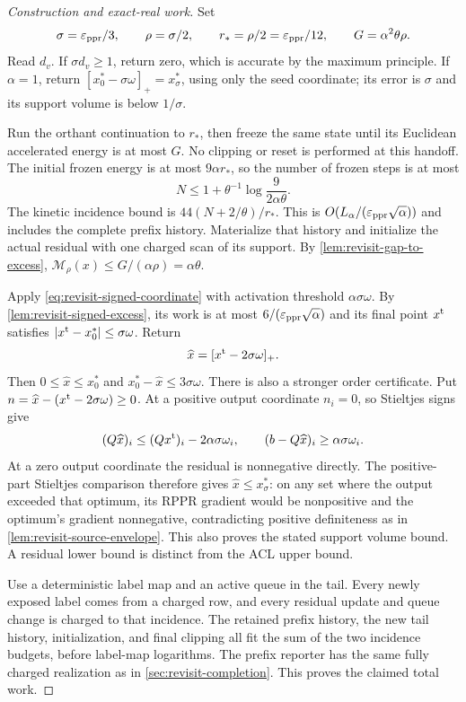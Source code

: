 \begin{proof}[Construction and exact-real work]
Set
\[
 \sigma=\varepsilon_{\mathrm{ppr}}/3,\qquad \rho=\sigma/2,\qquad
 r_*=\rho/2=\varepsilon_{\mathrm{ppr}}/12,\qquad G=\alpha^2\theta\rho.
\]
Read $d_v$. If $\sigma d_v\geq1$, return zero, which is accurate by
the maximum principle. If $\alpha=1$, return
$[x_0^*-\sigma\omega]_+=x_\sigma^*$, using only the seed coordinate;
its error is $\sigma$ and its support volume is below $1/\sigma$.

Run the orthant continuation to $r_*$, then freeze the same state until
its Euclidean accelerated energy is at most $G$. No clipping or reset is
performed at this handoff. The initial frozen energy is at most
$9\alpha r_*$, so the number of frozen steps is at most
\[
 N\leq1+\theta^{-1}\log\frac9{2\alpha\theta}.
\]
The kinetic incidence bound is
$44(N+2/\theta)/r_*$. This is
$O(L_\alpha/(\varepsilon_{\mathrm{ppr}}\sqrt\alpha))$ and includes the complete prefix
history. Materialize that history and initialize the actual residual with
one charged scan of its support. By \cref{lem:revisit-gap-to-excess},
$\mathcal M_\rho(x)\leq G/(\alpha\rho)=\alpha\theta$.

Apply \cref{eq:revisit-signed-coordinate} with activation threshold
$\alpha\sigma\omega$. By \cref{lem:revisit-signed-excess}, its work is
at most $6/(\varepsilon_{\mathrm{ppr}}\sqrt\alpha)$ and its final point $x^{\rm t}$
satisfies $|x^{\rm t}-x_0^*|\leq\sigma\omega$.
Return
\[
 \widehat x=[x^{\rm t}-2\sigma\omega]_+.
\]
Then $0\leq\widehat x\leq x_0^*$ and
$x_0^*-\widehat x\leq3\sigma\omega$.
There is also a stronger order certificate. Put
$n=\widehat x-(x^{\rm t}-2\sigma\omega)\geq0$.
At a positive output coordinate $n_i=0$, so Stieltjes signs give
\[
 (Q\widehat x)_i
   \leq (Qx^{\rm t})_i-2\alpha\sigma\omega_i,
 \qquad (b-Q\widehat x)_i\geq\alpha\sigma\omega_i.
\]
At a zero output coordinate the residual is nonnegative directly.
The positive-part Stieltjes comparison therefore gives
$\widehat x\leq x^*_\sigma$: on any set where the output exceeded that
optimum, its RPPR gradient would be nonpositive and the optimum's gradient
nonnegative, contradicting positive definiteness as in
\cref{lem:revisit-source-envelope}. This also proves the stated support
volume bound. A residual lower bound is distinct from the ACL upper bound.

Use a deterministic label map and an active queue in the tail. Every newly
exposed label comes from a charged row, and every residual update and queue
change is charged to that incidence. The retained prefix history, the new
tail history, initialization, and final clipping all fit the sum of the
two incidence budgets, before label-map logarithms. The prefix reporter
has the same fully charged realization as in
\cref{sec:revisit-completion}. This proves the
claimed total work.
\end{proof}

